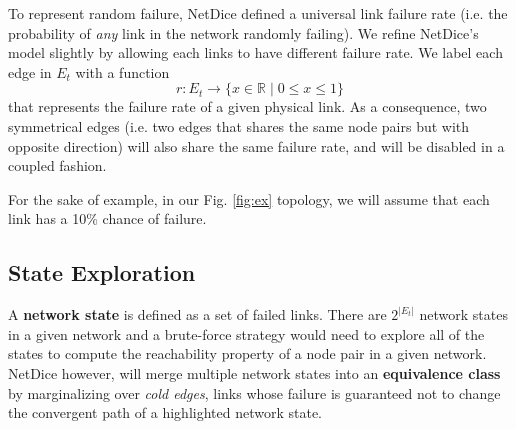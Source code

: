 To represent random failure, NetDice defined a universal link failure rate (i.e. 
the probability of \textit{any} link in the network randomly failing).
We refine NetDice's model slightly by allowing each links to have different failure rate.
We label each edge in $E_t$ with a function 
$$r: E_t \rightarrow \{x \in \mathbb{R} \mid 0 \le x \le 1\}$$ 
that represents the failure rate of a given physical link.
As a consequence, two symmetrical edges (i.e. two edges that shares the same node pairs but with 
opposite direction) will also share the same failure rate, and will be disabled in a coupled 
fashion.

For the sake of example, in our Fig. \ref{fig:ex} topology, we will assume that each link has a 
10\% chance of failure.



\subsection{State Exploration}
A \textbf{network state} is defined as a set of failed links.
There are $2^{|E_t|}$ network states in a given network and a brute-force strategy 
would need to explore all of the states to compute the reachability property of a 
node pair in a given network. 
NetDice however, will merge multiple network states into an \textbf{equivalence class}
by marginalizing over \textit{cold edges}, links whose failure is guaranteed not to 
change the convergent path of a highlighted network state.

